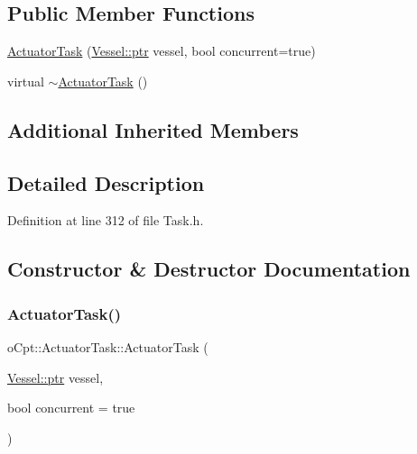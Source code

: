 \subsection*{Public Member Functions}
\begin{DoxyCompactItemize}
\item 
\hyperlink{classo_cpt_1_1_actuator_task_af06891ddcc32217567662979245af824}{Actuator\+Task} (\hyperlink{classo_cpt_1_1i_vessel_a43711a596f3bdfd0ca732ed3901edc97}{Vessel\+::ptr} vessel, bool concurrent=true)
\item 
virtual \hyperlink{classo_cpt_1_1_actuator_task_a829531567f8c0e660d2f4b541623915d}{$\sim$\+Actuator\+Task} ()
\end{DoxyCompactItemize}
\subsection*{Additional Inherited Members}


\subsection{Detailed Description}


Definition at line 312 of file Task.\+h.



\subsection{Constructor \& Destructor Documentation}
\hypertarget{classo_cpt_1_1_actuator_task_af06891ddcc32217567662979245af824}{}\label{classo_cpt_1_1_actuator_task_af06891ddcc32217567662979245af824} 
\subsubsection{\texorpdfstring{Actuator\+Task()}{ActuatorTask()}}
{\footnotesize\ttfamily o\+Cpt\+::\+Actuator\+Task\+::\+Actuator\+Task (\begin{DoxyParamCaption}\item[{\hyperlink{classo_cpt_1_1i_vessel_a43711a596f3bdfd0ca732ed3901edc97}{Vessel\+::ptr}}]{vessel,  }\item[{bool}]{concurrent = {\ttfamily true} }\end{DoxyParamCaption})}



